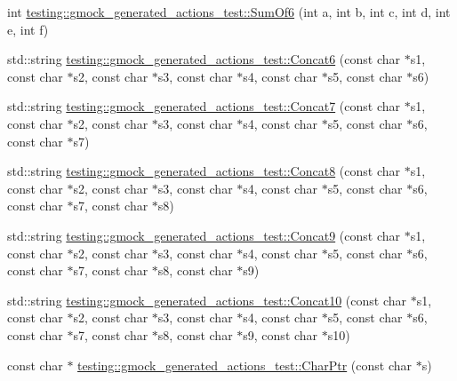 \begin{DoxyCompactItemize}
\item 
int \mbox{\hyperlink{namespacetesting_1_1gmock__generated__actions__test_a3f60acee43510c1603549a1f3bab61ad}{testing\+::gmock\+\_\+generated\+\_\+actions\+\_\+test\+::\+Sum\+Of6}} (int a, int b, int c, int d, int e, int f)
\item 
std\+::string \mbox{\hyperlink{namespacetesting_1_1gmock__generated__actions__test_a396ec2823c0f57354328548dadb56502}{testing\+::gmock\+\_\+generated\+\_\+actions\+\_\+test\+::\+Concat6}} (const char $\ast$s1, const char $\ast$s2, const char $\ast$s3, const char $\ast$s4, const char $\ast$s5, const char $\ast$s6)
\item 
std\+::string \mbox{\hyperlink{namespacetesting_1_1gmock__generated__actions__test_aab764d169a360cb5d3cbcd75dd15aa4a}{testing\+::gmock\+\_\+generated\+\_\+actions\+\_\+test\+::\+Concat7}} (const char $\ast$s1, const char $\ast$s2, const char $\ast$s3, const char $\ast$s4, const char $\ast$s5, const char $\ast$s6, const char $\ast$s7)
\item 
std\+::string \mbox{\hyperlink{namespacetesting_1_1gmock__generated__actions__test_a1f2f8cb9de8d3cc3affccab4e33a78e6}{testing\+::gmock\+\_\+generated\+\_\+actions\+\_\+test\+::\+Concat8}} (const char $\ast$s1, const char $\ast$s2, const char $\ast$s3, const char $\ast$s4, const char $\ast$s5, const char $\ast$s6, const char $\ast$s7, const char $\ast$s8)
\item 
std\+::string \mbox{\hyperlink{namespacetesting_1_1gmock__generated__actions__test_a923b7a16f0ea702fad1c8b2f9be8902d}{testing\+::gmock\+\_\+generated\+\_\+actions\+\_\+test\+::\+Concat9}} (const char $\ast$s1, const char $\ast$s2, const char $\ast$s3, const char $\ast$s4, const char $\ast$s5, const char $\ast$s6, const char $\ast$s7, const char $\ast$s8, const char $\ast$s9)
\item 
std\+::string \mbox{\hyperlink{namespacetesting_1_1gmock__generated__actions__test_aa3e21c9555fb8d1eafd7186d1e9b2db3}{testing\+::gmock\+\_\+generated\+\_\+actions\+\_\+test\+::\+Concat10}} (const char $\ast$s1, const char $\ast$s2, const char $\ast$s3, const char $\ast$s4, const char $\ast$s5, const char $\ast$s6, const char $\ast$s7, const char $\ast$s8, const char $\ast$s9, const char $\ast$s10)
\item 
const char $\ast$ \mbox{\hyperlink{namespacetesting_1_1gmock__generated__actions__test_a4532ef916bb515ce84af3826c95a8560}{testing\+::gmock\+\_\+generated\+\_\+actions\+\_\+test\+::\+Char\+Ptr}} (const char $\ast$s)
\item 

\end{DoxyCompactItemize}

